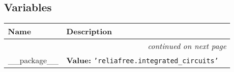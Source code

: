   \subsection{Variables}

    \vspace{-1cm}
\hspace{\varindent}\begin{longtable}{|p{\varnamewidth}|p{\vardescrwidth}|l}
\cline{1-2}
\cline{1-2} \centering \textbf{Name} & \centering \textbf{Description}& \\
\cline{1-2}
\endhead\cline{1-2}\multicolumn{3}{r}{\small\textit{continued on next page}}\\\endfoot\cline{1-2}
\endlastfoot\raggedright \_\-\_\-p\-a\-c\-k\-a\-g\-e\-\_\-\_\- & \raggedright \textbf{Value:} 
{\tt \texttt{'}\texttt{reliafree.integrated\_circuits}\texttt{'}}&\\
\cline{1-2}
\end{longtable}

